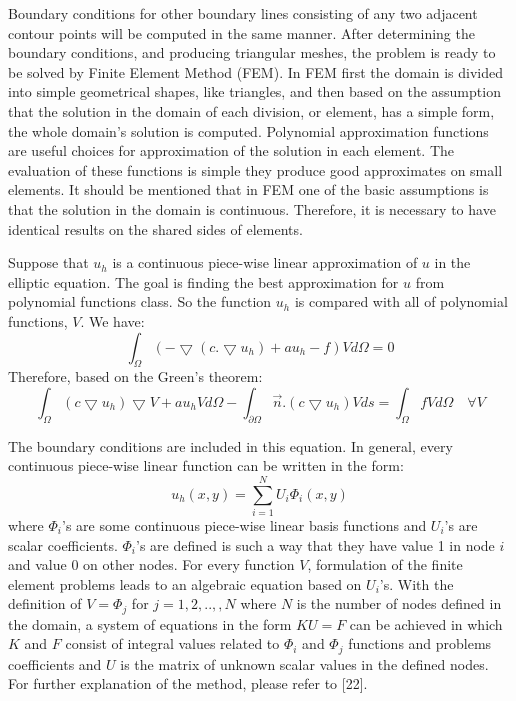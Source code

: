 \documentclass{jicspack}
\begin{document}
Boundary conditions for other boundary lines consisting of any two adjacent contour points
will be computed in the same manner. After determining the boundary conditions, and
producing triangular meshes, the problem is ready to be solved by Finite Element Method (FEM).
In FEM first the domain is divided into simple geometrical shapes, like triangles, and then
based on the assumption that the solution in the domain of each division, or element, has a
simple form, the whole domain's solution is computed. Polynomial approximation functions are useful choices for approximation of the solution in each element. The evaluation of these functions is simple they produce good approximates on small elements. It should be mentioned that in FEM one of the basic assumptions is that the solution in the domain is continuous. Therefore, it is necessary to have identical results on the shared sides of elements.

Suppose that $u_h$ is a continuous piece-wise linear approximation of $u$ in the elliptic equation. The goal is finding the best approximation for $u$ from polynomial functions class. So the function $u_h$ is compared with all of polynomial functions, $V$. We have: 
\begin{equation}
\int_\Omega (-\bigtriangledown(c.\bigtriangledown u_h)+a u_h-f)V d\Omega=0
\end{equation}
Therefore, based on the Green's theorem:
\begin{equation}
\int_\Omega (c\bigtriangledown u_h)\bigtriangledown V+a u_h V d\Omega - \int_{\partial \Omega} \overrightarrow{n}.(c \bigtriangledown u_h) V ds=\int_\Omega f V d \Omega \quad \forall V
\end{equation}

The boundary conditions are included in this equation. In general, every continuous piece-wise linear function can be written in the form: 
\begin{equation}
u_h(x,y)=\sum _{i=1} ^ N U_i \Phi_i (x,y)
\end{equation}
where $\Phi_i $'s are some continuous piece-wise linear basis functions and $U_i$'s
are scalar coefficients. $\Phi_i $'s are defined is such a way that they have value 1 in node $i$ and value $0$ on other nodes. For every function $V$, formulation of the finite element problems leads to an algebraic equation based on $U_i$'s. With the definition of $V=\Phi_j$ for $j = 1,2,..,,N$ where $N$ is the number of nodes defined in the domain, a system of equations in the form $KU = F$ can be achieved in which $K$ and $F$ consist of integral values related to $\Phi_i$ and $\Phi_j$ functions and problems coefficients and $U$ is the matrix of unknown scalar values in the defined nodes. For further explanation of the method, please refer to [22]. 
\end{document}
